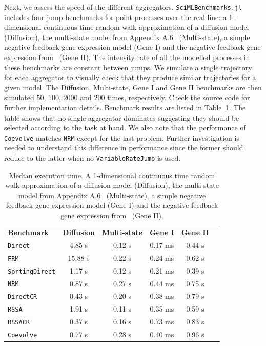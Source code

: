 \documentclass{juliacon}
\begin{document}
Next, we assess the speed of the different aggregators. \texttt{SciMLBenchmarks.jl} includes four jump benchmarks for point processes over the real line: a 1-dimensional continuous time random walk approximation of a diffusion model (Diffusion), the multi-state model from Appendix A.6~\cite{marchetti2017} (Multi-state), a simple negative feedback gene expression model (Gene I) and the negative feedback gene expression from~\cite{gupta2018} (Gene II). The intensity rate of all the modelled processes in these benchmarks are constant between jumps. We simulate a single trajectory for each aggregator to visually check that they produce similar trajectories for a given model. The Diffusion, Multi-state, Gene I and Gene II benchmarks are then simulated \( 50 \), \( 100 \), \( 2000 \) and \( 200 \) times, respectively. Check the source code for further implementation details. Benchmark results are listed in Table~\ref{tab:benchmark-biochemistry}. The table shows that no single aggregator dominates suggesting they should be selected according to the task at hand. We also note that the performance of \texttt{Coevolve} matches \texttt{NRM} except for the last problem. Further investigation is needed to understand this difference in performance since the former should reduce to the latter when no \texttt{VariableRateJump} is used.

\begin{table}
\centering
\begin{tabular}{lccccc}
\toprule
\textbf{ Benchmark } & \multicolumn{1}{c}{\textbf{ Diffusion }} & \multicolumn{1}{c}{\textbf{ Multi-state }} & \multicolumn{1}{c}{\textbf{ Gene I }} & \multicolumn{1}{c}{\textbf{ Gene II }} \\
\texttt{Direct} & 4.85 s & 0.12 s & 0.17 ms & 0.44 s \\
\texttt{FRM} & 15.88 s & 0.22 s & 0.24 ms & 0.62 s \\
\texttt{SortingDirect} & 1.17 s & 0.12 s & 0.21 ms & 0.39 s \\
\texttt{NRM} & 0.87 s & 0.27 s & 0.44 ms & 0.75 s \\
\texttt{DirectCR} & 0.43 s & 0.20 s & 0.38 ms & 0.79 s \\
\texttt{RSSA} & 1.91 s & 0.11 s & 0.35 ms & 0.59 s \\
\texttt{RSSACR} & 0.37 s & 0.16 s & 0.73 ms & 0.83 s \\
\texttt{Coevolve} & 0.77 s & 0.28 s & 0.40 ms & 0.96 s \\
\bottomrule
\end{tabular}
\caption{Median execution time. A 1-dimensional continuous time random walk approximation of a diffusion model (Diffusion), the multi-state model from Appendix A.6~\cite{marchetti2017} (Multi-state), a simple negative feedback gene expression model (Gene I) and the negative feedback gene expression from~\cite{gupta2018} (Gene II).}
\label{tab:benchmark-biochemistry}
\end{table}
\end{document}
